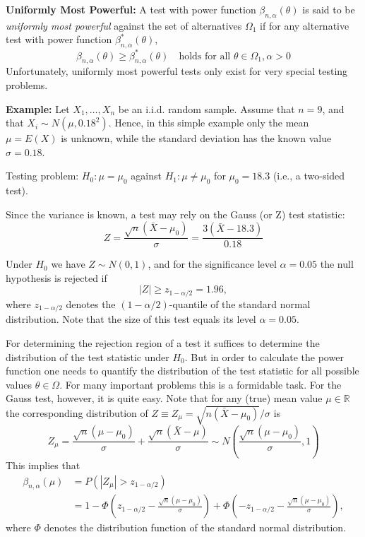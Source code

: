 \documentclass[]{book}
\theoremstyle{definition}
\theoremstyle{definition}
\theoremstyle{definition}
\theoremstyle{remark}
\begin{document}
\textbf{Uniformly Most Powerful:}
A test with power function \(\beta_{n,\alpha}(\theta)\) is said to be \emph{uniformly most powerful} against the set of alternatives \(\Omega_1\) if for any alternative test with power function \(\beta^*_{n,\alpha}(\theta)\),
\[\beta_{n,\alpha}(\theta)\ge \beta^*_{n,\alpha}(\theta)\quad \text{holds for all }\theta\in\Omega_1, \alpha>0\]
Unfortunately, uniformly most powerful tests only exist for very special testing problems.

\textbf{Example:}
Let \(X_1,\dots,X_n\) be an i.i.d. random sample.
Assume that \(n=9\), and that \(X_i\sim N(\mu,0.18^2)\).
Hence, in this simple example only the mean \(\mu=E(X)\) is unknown, while
the standard deviation has the known value \(\sigma=0.18\).

Testing problem: \(H_0:\mu=\mu_0\) against \(H_1:\mu\neq \mu_0\) for \(\mu_0=18.3\) (i.e., a two-sided test).

Since the variance is known, a test may rely on the Gauss (or Z) test statistic:
\[Z=\frac{\sqrt{n} (\bar X -\mu_0)}{\sigma} =\frac{3 (\bar X -18.3)}{0.18}\]

Under \(H_0\) we have \(Z\sim N(0,1)\), and for the significance level \(\alpha=0.05\) the null hypothesis is rejected if
\[|Z|\geq z_{1-\alpha/2}=1.96,\]
where \(z_{1-\alpha/2}\) denotes the \((1-\alpha/2)\)-quantile of the standard normal distribution. Note that the size of this test equals its level \(\alpha=0.05\).

For determining the rejection region of a test it suffices to determine the distribution of the test statistic under \(H_0\). But in order to calculate the power function one needs to quantify the distribution of the test statistic for all possible values \(\theta\in\Omega\). For many important problems this is a formidable task. For the Gauss test, however, it is quite easy. Note that for any (true) mean value \(\mu\in\mathbb{R}\) the corresponding distribution of \(Z\equiv Z_\mu=\sqrt{n(\bar X-\mu_0)}/\sigma\) is
\[Z_\mu=\frac{\sqrt{n} (\mu -\mu_0)}{\sigma}+\frac{\sqrt{n} (\bar X -\mu)}{\sigma}
\sim N\left(\frac{\sqrt{n} (\mu -\mu_0)}{\sigma}, 1\right)\]
This implies that
\begin{align*}
\beta_{n,\alpha}(\mu)
& = P\left(|Z_\mu|>z_{1-\alpha/2}\right)\\
& = 1-\Phi\left(z_{1-\alpha/2}-\frac{\sqrt{n} (\mu -\mu_0)}{\sigma}\right) + \Phi\left(-z_{1-\alpha/2}-\frac{\sqrt{n} (\mu -\mu_0)}{\sigma}\right),
\end{align*}
where \(\Phi\) denotes the distribution function of the standard normal distribution.
\end{document}
